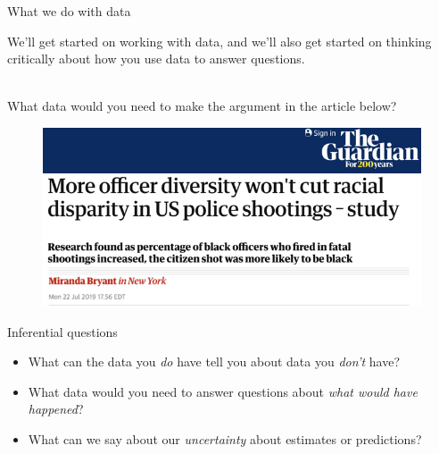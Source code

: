 \documentclass[xcolor={dvipsnames}, handout]{beamer}
\begin{document}

\begin{frame}{What we do with data}

We'll get started on working with data, and we'll also get started on thinking critically about how you use data to answer questions.\\~\ \pause


What data would you need to make the argument in the article below?

\begin{figure}[htbp] %
   \centering
   \includegraphics[width=.8\textwidth]{../assets/guardian.png} 
\end{figure}

\end{frame}



\begin{frame}{Inferential questions}

\begin{itemize}
\item What can the data you \textit{do} have tell you about data you \textit{don't} have? \pause
\item What data would you need to answer questions about \textit{what would have happened}? \pause
\item What can we say about our \textit{uncertainty} about estimates or predictions?
\end{itemize}

\end{frame}
\end{document}
